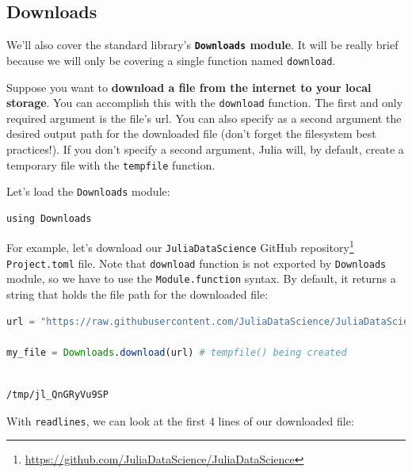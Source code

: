 \documentclass[
  notoc %
]{tufte-book}
\DeclareRobustCommand{\href}[2]{#2\footnote{\url{#1}}}
\newcommand{\passthrough}[1]{#1}
\begin{document}
\hypertarget{sec:downloads}{%
\subsection{Downloads}\label{sec:downloads}}

We'll also cover the standard library's
\textbf{\passthrough{\lstinline!Downloads!} module}. It will be really
brief because we will only be covering a single function named
\passthrough{\lstinline!download!}.

Suppose you want to \textbf{download a file from the internet to your
local storage}. You can accomplish this with the
\passthrough{\lstinline!download!} function. The first and only required
argument is the file's url. You can also specify as a second argument
the desired output path for the downloaded file (don't forget the
filesystem best practices!). If you don't specify a second argument,
Julia will, by default, create a temporary file with the
\passthrough{\lstinline!tempfile!} function.

Let's load the \passthrough{\lstinline!Downloads!} module:

\begin{lstlisting}
using Downloads
\end{lstlisting}

For example, let's download our
\href{https://github.com/JuliaDataScience/JuliaDataScience}{\passthrough{\lstinline!JuliaDataScience!}
GitHub repository} \passthrough{\lstinline!Project.toml!} file. Note
that \passthrough{\lstinline!download!} function is not exported by
\passthrough{\lstinline!Downloads!} module, so we have to use the
\passthrough{\lstinline!Module.function!} syntax. By default, it returns
a string that holds the file path for the downloaded file:

\begin{lstlisting}[language=Julia]
url = "https://raw.githubusercontent.com/JuliaDataScience/JuliaDataScience/main/Project.toml"

my_file = Downloads.download(url) # tempfile() being created
\end{lstlisting}

\begin{lstlisting}[language=Output]

/tmp/jl_QnGRyVu9SP

\end{lstlisting}

With \passthrough{\lstinline!readlines!}, we can look at the first 4
lines of our downloaded file:
\end{document}
